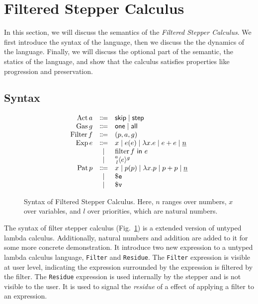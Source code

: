 \section{Filtered Stepper Calculus}

In this section, we will discuss the semantics of the \emph{Filtered Stepper
Calculus}. We first introduce the syntax of the language, then we discuss the
the dynamics of the language. Finally, we will discuss the optional part of the
semantic, the statics of the language, and show that the calculus satisfies
properties like progression and preservation.


\subsection{Syntax}

\begin{figure}[h]
  \begin{equation*}
    \begin{array}{rcl}
      \DefAct a    &\Coloneqq& \ActSkip \mid \ActStep \\
      \DefGas g    &\Coloneqq& \GasOne \mid \GasAll \\
      \DefFilter f &\Coloneqq& (p, a, g) \\
      \DefExp e    &\Coloneqq& x \mid e(e) \mid \Lam{x}{e} \mid e + e \mid \Nat{n} \\
                   &\mid     & \Filter{f}{e} \\
                   &\mid     & \Residue{a}{g}{l}{e} \\
      \DefPat p    &\Coloneqq& x \mid p(p) \mid \Lam{x}{p} \mid p + p \mid \Nat{n} \\
                   &\mid     & \$\mathtt{e} \\
                   &\mid     & \$\mathtt{v} \\
    \end{array}
  \end{equation*}
  \caption{Syntax of Filtered Stepper Calculus. Here, $n$ ranges over numbers, $x$ over variables, and $l$ over priorities, which are natural numbers.}
  \label{fig:filter-syntax}
\end{figure}



The syntax of filter stepper calculus (Fig.~\ref{fig:filter-syntax}) is a
extended version of untyped lambda calculus. Additionally, natural numbers and
addition are added to it for some more concrete demonstration. It introduce two
new expression to a untyped lambda calculus language, \texttt{Filter} and
\texttt{Residue}. The \texttt{Filter} expression is visible at user level,
indicating the expression surrounded by the expression is filtered by the
filter. The \texttt{Residue} expression is used internally by the stepper and is
not visible to the user. It is used to signal the \emph{residue} of a effect of
applying a filter to an expression.

